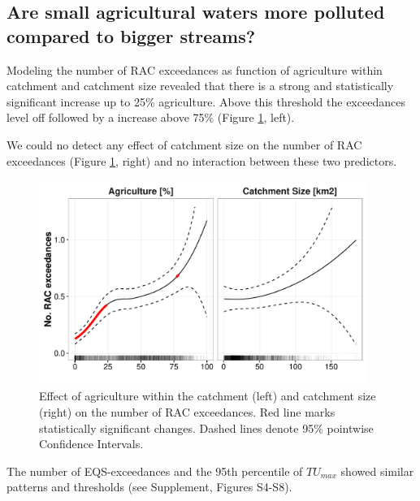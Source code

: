 \documentclass[journal=esthag,manuscript=article]{achemso}
\begin{document}
\subsection{Are small agricultural waters more polluted compared to bigger streams?}

Modeling the number of RAC exceedances as function of agriculture within catchment and catchment size revealed that there is a strong and statistically significant increase up to 25\% agriculture.
Above this threshold the exceedances level off followed by a increase above 75\% (Figure \ref{fig:fig4}, left).

We could no detect any effect of catchment size on the number of RAC exceedances (Figure \ref{fig:fig4}, right) and no interaction between these two predictors.

\begin{figure}[ht]
  \includegraphics[width=0.95\textwidth]{figure4.pdf}
  \caption{Effect of agriculture within the catchment (left) and catchment size (right) on the number of RAC exceedances. Red line marks statistically significant changes. Dashed lines denote 95\% pointwise Confidence Intervals.
  }
  \label{fig:fig4}
\end{figure}

The number of EQS-exceedances and the 95th percentile of $TU_{max}$ showed similar patterns and thresholds (see Supplement, Figures S4-S8). 
\end{document}
